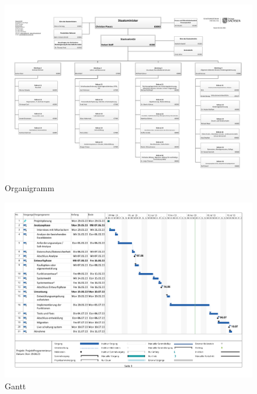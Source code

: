 

\begin{figure}[htb]
    \centering
    \includegraphics[angle=90, page=1,height=0.90\textheight, keepaspectratio]{anhang/abb/21_01_06_Organigramm_SMK.pdf}
    \caption[Organigramm des SMK]{Organigramm}
    \label{abb:Organigramm}
\end{figure}

\begin{figure}[htb]
    \centering
    \includegraphics[angle=90, page=1,height=0.90\textheight, keepaspectratio]{anhang/abb/ProjektProgrammierungZeitplan.pdf}
    \caption[Ganttdiagramm]{Gantt}
    \label{abb:Gantt}
\end{figure}

